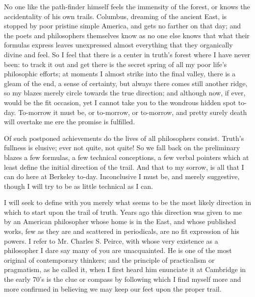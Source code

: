 \documentclass[]{article}
\begin{document}
No one like the path-finder himself feels the immensity of the forest, or knows the accidentality of his own trails. Columbus, dreaming of the ancient East, is stopped by poor pristine simple America, and gets no farther on that day; and the poets and philosophers themselves know as no one else knows that what their formulas express leaves unexpressed almost everything that they organically divine and feel. So I feel that there is a center in truth's forest where I have never been: to track it out and get there is the secret spring of all my poor life's philosophic efforts; at moments I almost strike into the final valley, there is a gleam of the end, a sense of certainty, but always there comes still another ridge, so my blazes merely circle towards the true direction; and although now, if ever, would be the fit occasion, yet I cannot take you to the wondrous hidden spot to-day. To-morrow it must be, or to-morrow, or to-morrow, and pretty surely death will overtake me ere the promise is fulfilled. 

Of such postponed achievements do the lives of all philosophers consist. Truth's fullness is elusive; ever not quite, not quite! So we fall back on the preliminary blazes a few formulas, a few technical conceptions, a few verbal pointers which at least define the initial direction of the trail. And that to my sorrow, is all that I can do here at Berkeley to-day. Inconclusive I must be, and merely suggestive, though I will try to be as little technical as I can. 

I will seek to define with you merely what seems to be the most likely direction in which to start upon the trail of truth. Years ago this direction was given to me by an American philosopher whose home is in the East, and whose published works, few as they are and scattered in periodicals, are no fit expression of his powers. I refer to Mr. Charles S. Peirce, with whose very existence as a philosopher I dare say many of you are unacquainted. He is one of the most original of contemporary thinkers; and the principle of practicalism or pragmatism, as he called it, when I first heard him enunciate it at Cambridge in the early 70's is the clue or compass by following which I find myself more and more confirmed in believing we may keep our feet upon the proper trail. 
\end{document}
